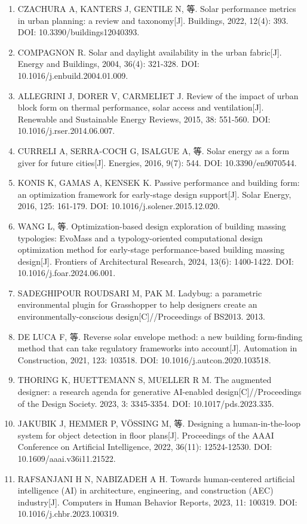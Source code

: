 \documentclass[UTF8,zihao=-4,a4paper]{ctexart}
\begin{document}
\begin{enumerate}
\item CZACHURA A, KANTERS J, GENTILE N, 等. Solar performance metrics in urban planning: a review and taxonomy[J]. Buildings, 2022, 12(4): 393. DOI: 10.3390/buildings12040393.
\item COMPAGNON R. Solar and daylight availability in the urban fabric[J]. Energy and Buildings, 2004, 36(4): 321-328. DOI: 10.1016/j.enbuild.2004.01.009.
\item ALLEGRINI J, DORER V, CARMELIET J. Review of the impact of urban block form on thermal performance, solar access and ventilation[J]. Renewable and Sustainable Energy Reviews, 2015, 38: 551-560. DOI: 10.1016/j.rser.2014.06.007.
\item CURRELI A, SERRA-COCH G, ISALGUE A, 等. Solar energy as a form giver for future cities[J]. Energies, 2016, 9(7): 544. DOI: 10.3390/en9070544.
\item KONIS K, GAMAS A, KENSEK K. Passive performance and building form: an optimization framework for early-stage design support[J]. Solar Energy, 2016, 125: 161-179. DOI: 10.1016/j.solener.2015.12.020.
\item WANG L, 等. Optimization-based design exploration of building massing typologies: EvoMass and a typology-oriented computational design optimization method for early-stage performance-based building massing design[J]. Frontiers of Architectural Research, 2024, 13(6): 1400-1422. DOI: 10.1016/j.foar.2024.06.001.
\item SADEGHIPOUR ROUDSARI M, PAK M. Ladybug: a parametric environmental plugin for Grasshopper to help designers create an environmentally-conscious design[C]//Proceedings of BS2013. 2013.
\item DE LUCA F, 等. Reverse solar envelope method: a new building form-finding method that can take regulatory frameworks into account[J]. Automation in Construction, 2021, 123: 103518. DOI: 10.1016/j.autcon.2020.103518.
\item THORING K, HUETTEMANN S, MUELLER R M. The augmented designer: a research agenda for generative AI-enabled design[C]//Proceedings of the Design Society. 2023, 3: 3345-3354. DOI: 10.1017/pds.2023.335.
\item JAKUBIK J, HEMMER P, VÖSSING M, 等. Designing a human-in-the-loop system for object detection in floor plans[J]. Proceedings of the AAAI Conference on Artificial Intelligence, 2022, 36(11): 12524-12530. DOI: 10.1609/aaai.v36i11.21522.
\item RAFSANJANI H N, NABIZADEH A H. Towards human-centered artificial intelligence (AI) in architecture, engineering, and construction (AEC) industry[J]. Computers in Human Behavior Reports, 2023, 11: 100319. DOI: 10.1016/j.chbr.2023.100319.
\end{enumerate}
\end{document}
